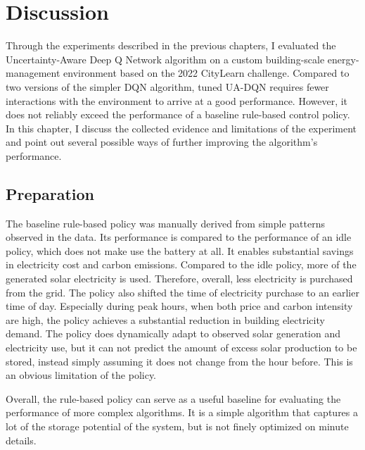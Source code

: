
\chapter{Discussion}
  \label{Discussion}

Through the experiments described in the previous chapters, I evaluated the Uncertainty-Aware Deep Q Network algorithm on a custom building-scale energy-management environment based on the 2022 CityLearn challenge.
Compared to two versions of the simpler DQN algorithm, tuned UA-DQN requires fewer interactions with the environment to arrive at a good performance.
However, it does not reliably exceed the performance of a baseline rule-based control policy.
In this chapter, I discuss the collected evidence and limitations of the experiment and point out several possible ways of further improving the algorithm's performance.

\section{Preparation}
The baseline rule-based policy was manually derived from simple patterns observed in the data.
Its performance is compared to the performance of an idle policy, which does not make use the battery at all.
It enables substantial savings in electricity cost and carbon emissions.
Compared to the idle policy, more of the generated solar electricity is used. 
Therefore, overall, less electricity is purchased from the grid.
The policy also shifted the time of electricity purchase to an earlier time of day.
Especially during peak hours, when both price and carbon intensity are high, the policy achieves a substantial reduction in building electricity demand.
The policy does dynamically adapt to observed solar generation and electricity use, but it can not predict the amount of excess solar production to be stored, instead simply assuming it does not change from the hour before.
This is an obvious limitation of the policy.

Overall, the rule-based policy can serve as a useful baseline for evaluating the performance of more complex algorithms.
It is a simple algorithm that captures a lot of the storage potential of the system, but is not finely optimized on minute details.

